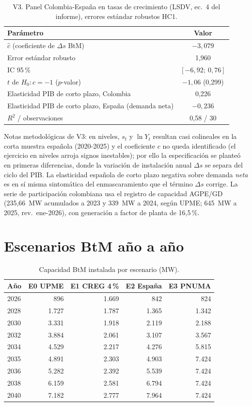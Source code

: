 \begin{table}[H]\centering\small
\caption{V3. Panel Colombia-España en tasas de crecimiento (LSDV,
ec.~4 del informe), errores estándar robustos HC1.}
\begin{tabular}{lc}
\toprule
Parámetro & Valor\\
\midrule
$\hat{c}$ (coeficiente de $\Delta s$ BtM) & $-3{,}079$\\
Error estándar robusto & 1,960\\
IC 95\,\% & $[-6{,}92;\ 0{,}76]$\\
$t$ de $H_0\!:c=-1$ ($p$-valor) & $-1{,}06$ (0,299)\\
Elasticidad PIB de corto plazo, Colombia & 0,226\\
Elasticidad PIB de corto plazo, España (demanda neta) & $-0{,}236$\\
$R^2$ / observaciones & 0,58 / 30\\
\bottomrule
\end{tabular}
\end{table}

Notas metodológicas de V3: en niveles, $s_t$ y $\ln Y_t$ resultan casi
colineales en la corta muestra española (2020-2025) y el coeficiente $c$ no
queda identificado (el ejercicio en niveles arroja signos inestables); por
ello la especificación se planteó en primeras diferencias, donde la variación
de instalación anual $\Delta s$ se separa del ciclo del PIB. La elasticidad
española de corto plazo negativa sobre demanda \emph{neta} es en sí misma
sintomática del enmascaramiento que el término $\Delta s$ corrige. La serie
de participación colombiana usa el registro de capacidad AGPE/GD (235,66~MW
acumulados a 2023 y 339~MW a 2024, según UPME; 645~MW a 2025, rev.\
ene-2026), con generación a factor de planta de 16,5\,\%.

\section{Escenarios BtM año a año}

\begin{table}[H]\centering\small
\caption{Capacidad BtM instalada por escenario (MW).}
\begin{tabular}{lrrrr}
\toprule
Año & E0 UPME & E1 CREG 4\,\% & E2 España & E3 PNUMA\\
\midrule
2026 & 896   & 1.669 & 842   & 824\\
2028 & 1.727 & 1.787 & 1.365 & 1.342\\
2030 & 3.331 & 1.918 & 2.119 & 2.188\\
2032 & 3.884 & 2.061 & 3.107 & 3.567\\
2034 & 4.529 & 2.217 & 4.276 & 5.815\\
2035 & 4.891 & 2.303 & 4.903 & 7.424\\
2036 & 5.282 & 2.392 & 5.539 & 7.424\\
2038 & 6.159 & 2.581 & 6.794 & 7.424\\
2040 & 7.182 & 2.777 & 7.964 & 7.424\\
\bottomrule
\end{tabular}
\end{table}

